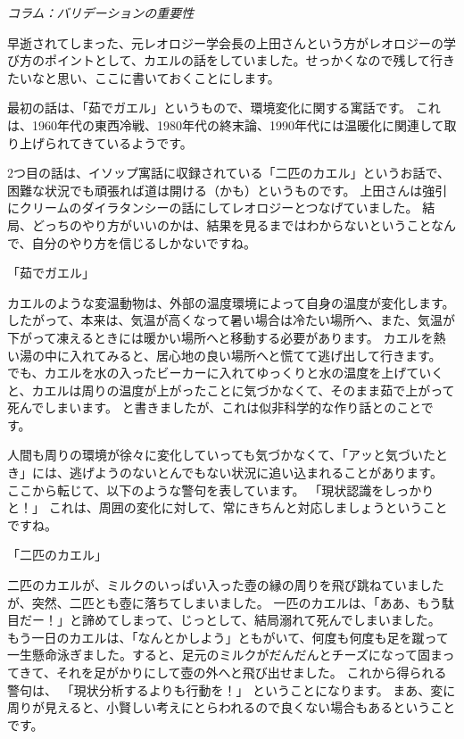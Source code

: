 \documentclass[uplatex,dvipdfmx,a4paper,11pt]{jsreport}
\begin{document}
	\begin{longartdeco}
		\begin{center}
		\emph{コラム：バリデーションの重要性}	
		\end{center}
	
		早逝されてしまった、元レオロジー学会長の上田さんという方がレオロジーの学び方のポイントとして、カエルの話をしていました。せっかくなので残して行きたいなと思い、ここに書いておくことにします。

	最初の話は、「茹でガエル」というもので、環境変化に関する寓話です。
	これは、1960年代の東西冷戦、1980年代の終末論、1990年代には温暖化に関連して取り上げられてきているようです。

	2つ目の話は、イソップ寓話に収録されている「二匹のカエル」というお話で、困難な状況でも頑張れば道は開ける（かも）というものです。
	上田さんは強引にクリームのダイラタンシーの話にしてレオロジーとつなげていました。
	結局、どっちのやり方がいいのかは、結果を見るまではわからないということなんで、自分のやり方を信じるしかないですね。

	「茹でガエル」

	カエルのような変温動物は、外部の温度環境によって自身の温度が変化します。
	したがって、本来は、気温が高くなって暑い場合は冷たい場所へ、また、気温が下がって凍えるときには暖かい場所へと移動する必要があります。
	カエルを熱い湯の中に入れてみると、居心地の良い場所へと慌てて逃げ出して行きます。
	でも、カエルを水の入ったビーカーに入れてゆっくりと水の温度を上げていくと、カエルは周りの温度が上がったことに気づかなくて、そのまま茹で上がって死んでしまいます。
	と書きましたが、これは似非科学的な作り話とのことです。

	人間も周りの環境が徐々に変化していっても気づかなくて、「アッと気づいたとき」には、逃げようのないとんでもない状況に追い込まれることがあります。
	ここから転じて、以下のような警句を表しています。
	「現状認識をしっかりと！」
	これは、周囲の変化に対して、常にきちんと対応しましょうということですね。

	「二匹のカエル」

	二匹のカエルが、ミルクのいっぱい入った壺の縁の周りを飛び跳ねていましたが、突然、二匹とも壺に落ちてしまいました。
	一匹のカエルは、「ああ、もう駄目だー！」と諦めてしまって、じっとして、結局溺れて死んでしまいました。
	もう一日のカエルは、「なんとかしよう」ともがいて、何度も何度も足を蹴って一生懸命泳ぎました。すると、足元のミルクがだんだんとチーズになって固まってきて、それを足がかりにして壺の外へと飛び出せました。
	これから得られる警句は、
	「現状分析するよりも行動を！」
	ということになります。
	まあ、変に周りが見えると、小賢しい考えにとらわれるので良くない場合もあるということです。
	
	\end{longartdeco}
\end{document}
